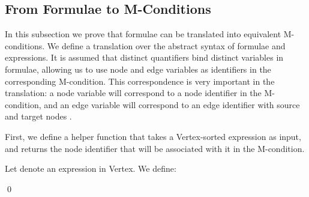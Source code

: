 \documentclass{llncs}
\begin{document}
	
	
	\subsection{From Formulae to M-Conditions}
	
	In this subsection we prove that formulae can be translated into equivalent M-conditions. We define a translation over the abstract syntax of formulae and expressions. It is assumed that distinct quantifiers bind distinct variables in formulae, allowing us to use node and edge variables as identifiers in the corresponding M-condition. This correspondence is very important in the translation: a node variable  will correspond to a node identifier  in the M-condition, and an edge variable  will correspond to an edge identifier  with source and target nodes .
	
	First, we define a helper function that takes a Vertex-sorted expression as input, and returns the node identifier that will be associated with it in the M-condition.
	
	
	\begin{definition}\label{def:VertexID}\rm
		Let  denote an expression in Vertex. We define:

			
		\qed
	\end{definition}
	
\end{document}
